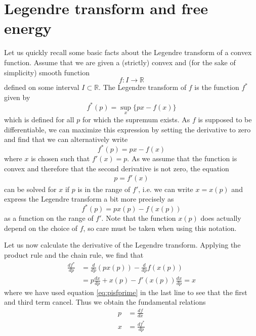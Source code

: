 \documentclass[a4paper, draft]{article}
\theoremstyle{own}
\theoremstyle{remark}
\newcommand{\R}{\mathbb{R}}
\begin{document}
\section{Legendre transform and free energy}

Let us quickly recall some basic facts about the Legendre transform of a convex function. Assume that we are given a (strictly) convex and (for the sake of simplicity) smooth function
$$
f \colon I \rightarrow \R
$$
defined on some interval $I \subset \R$. The Legendre transform of $f$ is the function $f^*$ given by
$$
f^*(p) = \sup_{x} \{ px - f(x)\}
$$
which is defined for all $p$ for which the supremum exists. As $f$ is supposed to be differentiable, we can maximize this expression by setting the derivative to zero and find that we can alternatively write
$$
f^*(p) = px - f(x)
$$
where $x$ is chosen such that $f'(x) = p$. As we assume that the function is convex and therefore that the second derivative is not zero, the equation
\begin{align}\label{eq:pisfprime}
p = f'(x)
\end{align}
can be solved for $x$ if $p$ is in the range of $f'$, i.e. we can write $x = x(p)$ and express the Legendre transform a bit more precisely as
$$
f^*(p) = px(p) - f(x(p))
$$
as a function on the range of $f'$. Note that the function $x(p)$ does actually depend on the choice of $f$, so care must be taken when using this notation.

Let us now calculate the derivative of the Legendre transform. Applying the product rule and the chain rule, we find that
\begin{align*}
\frac{df^*}{dp} &= \frac{d}{dp} (px(p)) - \frac{d}{dp} f(x(p)) \\
&= p \frac{dx}{dp} + x(p) - f'(x(p)) \frac{dx}{dp} = x
\end{align*}
where we have used equation \ref{eq:pisfprime} in the last line to see that the first and third term cancel. Thus we obtain the fundamental relations
\begin{align*}
p &= \frac{df}{dx} \\
x &= \frac{df^*}{dp}
\end{align*}
\end{document}
